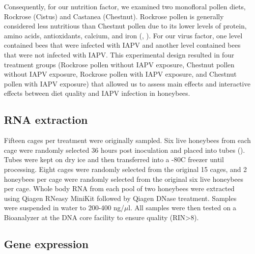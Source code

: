 \documentclass[11pt,a4paper,oldfontcommands,openany]{memoir}
\numberwithin{equation}{section} %
\begin{document}
Consequently, for our nutrition factor, we examined two monofloral pollen diets, Rockrose (Cistus) and Castanea (Chestnut). Rockrose pollen is generally considered less nutritious than Chestnut pollen due to its lower levels of protein, amino acids, antioxidants, calcium, and iron (\citealt{DiPasquale}, \citealt{adamInt}). For our virus factor, one level contained bees that were infected with IAPV and another level contained bees that were not infected with IAPV. This experimental design resulted in four treatment groups (Rockrose pollen without IAPV exposure, Chestnut pollen without IAPV exposure, Rockrose pollen with IAPV exposure, and Chestnut pollen with IAPV exposure) that allowed us to assess main effects and interactive effects between diet quality and IAPV infection in honeybees.

\subsection{RNA extraction}

Fifteen cages per treatment were originally sampled. Six live honeybees from each cage were randomly selected 36 hours post inoculation and placed into tubes (\citealt{carrillo}). Tubes were kept on dry ice and then transferred into a -80C freezer until processing. Eight cages were randomly selected from the original 15 cages, and 2 honeybees per cage were randomly selected from the original six live honeybees per cage. Whole body RNA from each pool of two honeybees were extracted using Qiagen RNeasy MiniKit followed by Qiagen DNase treatment. Samples were suspended in water to 200-400 ng/$\mu$l. All samples were then tested on a Bioanalyzer at the DNA core facility to ensure quality (RIN>8).

\subsection{Gene expression}
\end{document}
